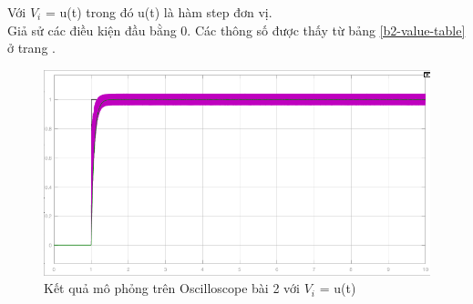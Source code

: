 \documentclass{standalone}
\begin{document}
	Với $V_i$ = u(t) trong đó u(t) là hàm step đơn vị.\\
	Giả sử các điều kiện đầu bằng 0. Các thông số được thấy từ bảng \ref{b2-value-table} ở trang \pageref{b2-value-table}.\\
	\begin{figure}[!htp]
		\centering
		\includegraphics[scale=0.5]{images/b2-scop-step}
		\caption{Kết quả mô phỏng trên Oscilloscope bài 2 với $V_i$ = u(t) }
		\label{b2-scop-step}
	\end{figure}
	
	
	
	
	
\end{document}
